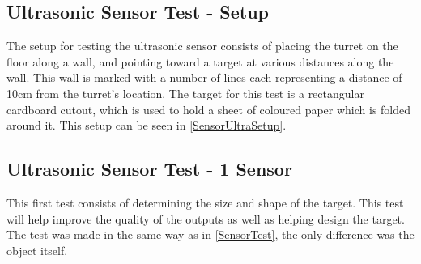 \subsection{Ultrasonic Sensor Test - Setup}\label{UltraTestSetup}
The setup for testing the ultrasonic sensor consists of placing the turret on
the floor along a wall, and pointing toward a target at various distances along
the wall. This wall is marked with a number of lines each representing a
distance of 10cm from the turret's location. The target for this test is a
rectangular cardboard cutout, which is used to hold a sheet of coloured paper
which is folded around it. This setup can be seen in
\autoref{SensorUltraSetup}.


\subsection{Ultrasonic Sensor Test - 1 Sensor}\label{UltraTestPlacement}
This first test consists of determining the size and shape of the target. This
test will help improve the quality of the outputs as well as helping design the
target. The test was made in the same way as in \autoref{SensorTest}, the
only difference was the object itself.\nl


% 
% 

